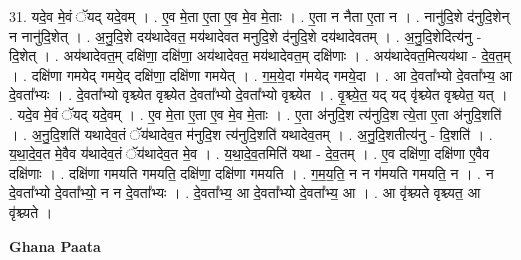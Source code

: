 \documentclass[17pt]{extarticle}
\begin{document}
31. यदे॒व मे॒वं ॅयद् यदे॒वम् । . ए॒व मे॒ता ए॒ता ए॒व मे॒व मे॒ताः । . ए॒ता न नैता ए॒ता न । . नानु॑दि॒शे द॑नुदि॒शेन् न नानु॑दि॒शेत् । . अ॒नु॒दि॒शे दय॑थादेवत॒ मय॑थादेवत मनुदि॒शे द॑नुदि॒शे दय॑थादेवतम् । . अ॒नु॒दि॒शेदित्य॑नु - दि॒शेत् । . अय॑थादेवत॒म् दक्षि॑णा॒ दक्षि॑णा॒ अय॑थादेवत॒ मय॑थादेवत॒म् दक्षि॑णाः । . अय॑थादेवत॒मित्यय॑था - दे॒व॒त॒म् । . दक्षि॑णा गमयेद् गमये॒द् दक्षि॑णा॒ दक्षि॑णा गमयेत् । . ग॒म॒ये॒दा ग॑मयेद् गमये॒दा । . आ दे॒वता᳚भ्यो दे॒वता᳚भ्य॒ आ दे॒वता᳚भ्यः । . दे॒वता᳚भ्यो वृश्च्येत वृश्च्येत दे॒वता᳚भ्यो दे॒वता᳚भ्यो वृश्च्येत । . वृ॒श्च्ये॒त॒ यद् यद् वृ॑श्च्येत वृश्च्येत॒ यत् । . यदे॒व मे॒वं ॅयद् यदे॒वम् । . ए॒व मे॒ता ए॒ता ए॒व मे॒व मे॒ताः । . ए॒ता अ॑नुदि॒श त्य॑नुदि॒श त्ये॒ता ए॒ता अ॑नुदि॒शति॑ । . अ॒नु॒दि॒शति॑ यथादेव॒तं ॅय॑थादेव॒त म॑नुदि॒श त्य॑नुदि॒शति॑ यथादेव॒तम् । . अ॒नु॒दि॒शतीत्य॑नु - दि॒शति॑ । . य॒था॒दे॒व॒त मे॒वैव य॑थादेव॒तं ॅय॑थादेव॒त मे॒व । . य॒था॒दे॒व॒तमिति॑ यथा - दे॒व॒तम् । . ए॒व दक्षि॑णा॒ दक्षि॑णा ए॒वैव दक्षि॑णाः । . दक्षि॑णा गमयति गमयति॒ दक्षि॑णा॒ दक्षि॑णा गमयति । . ग॒म॒य॒ति॒ न न ग॑मयति गमयति॒ न । . न दे॒वता᳚भ्यो दे॒वता᳚भ्यो॒ न न दे॒वता᳚भ्यः । . दे॒वता᳚भ्य॒ आ दे॒वता᳚भ्यो दे॒वता᳚भ्य॒ आ । . आ वृ॑श्च्यते वृश्च्यत॒ आ वृ॑श्च्यते । \newline

\textbf{Ghana Paata } \newline
\end{document}
